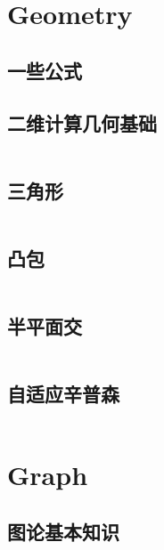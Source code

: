 \documentclass[titlepage, a4paper]{article}
\begin{document}
	\begin{titlepage}
		
	\end{titlepage}
	\begin{multicols}{2}
		\setcounter{tocdepth}{3}
		\begingroup
		\let\cleardoublepage\relax
		\let\clearpage\relax
		\begin{small}
		\begin{spacing}{0.75}
		\tableofcontents
		\end{spacing}
		\end{small}
		\newpage
		\begin{spacing}{0.6}
			
			\section{Geometry}
				\subsection{一些公式}
					
				\subsection{二维计算几何基础}
					\inputminted{cpp}{src/Geometry/geo.cpp}
				\subsection{三角形}
					\inputminted{cpp}{src/Geometry/triangle.cpp}
				\subsection{凸包}
					\inputminted{cpp}{src/Geometry/凸包.cpp}
				\subsection{半平面交}
					\inputminted{cpp}{src/Geometry/半平面交.cpp}
				\subsection{自适应辛普森}
					\inputminted{cpp}{src/Geometry/simpson.cpp}
			\newpage
			\section{Graph}
				\subsection{图论基本知识}
					

\end{spacing}
\end{multicols}
\end{document}
